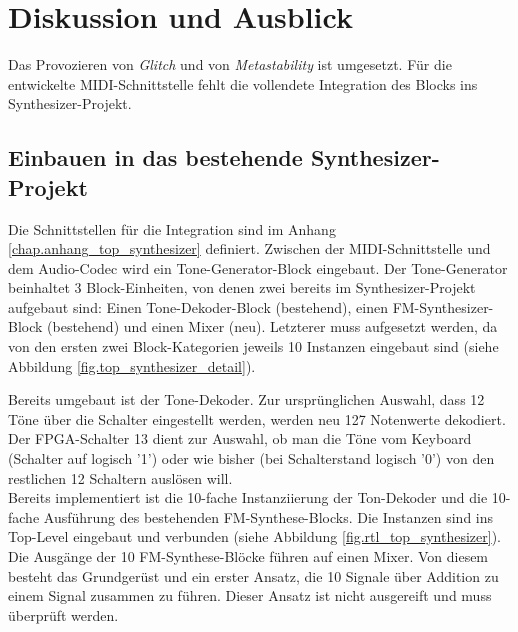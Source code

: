 
\chapter{Diskussion und Ausblick}\label{chap.diskussion}

Das Provozieren von \textit{Glitch} und von \textit{Metastability} ist umgesetzt. Für die entwickelte MIDI-Schnittstelle fehlt die vollendete Integration des Blocks ins Synthesizer-Projekt. 

\section{Einbauen in das bestehende Synthesizer-Projekt}

Die Schnittstellen für die Integration sind im Anhang \ref{chap.anhang_top_synthesizer} definiert. Zwischen der MIDI-Schnittstelle und dem Audio-Codec wird ein Tone-Generator-Block eingebaut. Der Tone-Generator beinhaltet 3 Block-Einheiten, von denen zwei bereits im Synthesizer-Projekt aufgebaut sind: Einen Tone-Dekoder-Block (bestehend), einen FM-Synthesizer-Block (bestehend) und einen Mixer (neu). Letzterer muss aufgesetzt werden, da von den ersten zwei Block-Kategorien jeweils 10 Instanzen eingebaut sind (siehe Abbildung \ref{fig.top_synthesizer_detail}). 

Bereits umgebaut ist der Tone-Dekoder. Zur ursprünglichen Auswahl, dass 12 Töne über die Schalter eingestellt werden, werden neu 127 Notenwerte dekodiert. Der FPGA-Schalter 13 dient zur Auswahl, ob man die Töne vom Keyboard (Schalter auf logisch '1') oder wie bisher (bei Schalterstand logisch '0') von den restlichen 12 Schaltern auslösen will.\\
Bereits implementiert ist die 10-fache Instanziierung der Ton-Dekoder und die 10-fache Ausführung des bestehenden FM-Synthese-Blocks. Die Instanzen sind ins Top-Level eingebaut und verbunden (siehe Abbildung \ref{fig.rtl_top_synthesizer}). Die Ausgänge der 10 FM-Synthese-Blöcke führen auf einen Mixer. Von diesem besteht das Grundgerüst und ein erster Ansatz, die 10 Signale über Addition zu einem Signal zusammen zu führen. Dieser Ansatz ist nicht ausgereift und muss überprüft werden.

